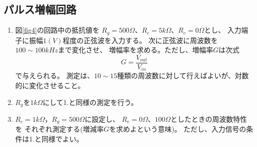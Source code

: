 \documentclass[12pt]{jarticle}
\begin{document}
\subsection{パルス増幅回路}
\begin{enumerate}
    \item 図\ref{fig4}の回路中の抵抗値を
          $R_g = 500\Omega$、$R_c = 5k\Omega$、$R_e = 0\Omega$とし、
          入力端子に振幅$1(V)$程度の正弦波を入力する。
          次に正弦波に周波数を$100\sim100kHz$まで変化させ、
          増幅率を求める。ただし、増幅率$G$は次式
          \begin{equation}
              G = \frac{V_{out}}{V_{in}}
          \end{equation}
          で与えられる。
          測定は、$10\sim15$種類の周波数に対して行えばよいが、対数的に変化させること。
    \item$R_g$を$1k\Omega$にして1.と同様の測定を行う。
    \item$R_c = 1k\Omega，R_g = 500\Omega$に設定し、
          $R_e=0\Omega、100\Omega$としたときの周波数特性を
          それぞれ測定する(増減率$G$を求めよという意味)。
          ただし、入力信号の条件は1.と同様でよい。
\end{enumerate}
\end{document}
